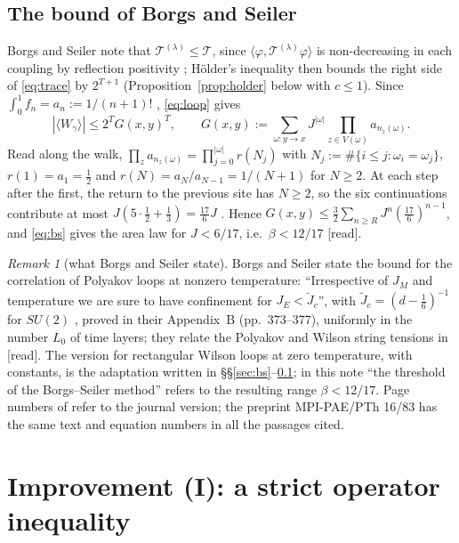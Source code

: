 \documentclass[11pt,a4paper]{article}
\theoremstyle{plain}
\theoremstyle{remark}
\newtheorem{remark}[theorem]{Remark}
\numberwithin{equation}{section}
\newcommand{\cT}{\mathcal{T}}
\newcommand{\st}[1]{\textsf{[#1]}}
\begin{document}
\subsection{The bound of Borgs and Seiler}\label{sec:bsbound}
Borgs and Seiler note that $\cT^{(\lambda)}\le\cT$, since $\langle\varphi,\cT^{(\lambda)}\varphi\rangle$ is non-decreasing in each
coupling by reflection positivity \cite[(B.11), p.~376]{BS83}; Hölder's inequality then bounds the right side of \eqref{eq:trace} by
$2^{T+1}$ (Proposition~\ref{prop:holder} below with $c\le1$). Since $\int_0^1f_n=a_n:=1/(n+1)!$ \cite[(B.14), p.~376]{BS83}, \eqref{eq:loop}
gives
\begin{equation}\label{eq:bs}
|\langle W_\gamma\rangle|\le2^TG(x,y)^T,\qquad G(x,y):=\sum_{\omega:y\to x}J^{|\omega|}\prod_{z\in V(\omega)}a_{n_z(\omega)} .
\end{equation}
Read along the walk, $\prod_za_{n_z(\omega)}=\prod_{j=0}^{|\omega|}r(N_j)$ with $N_j:=\#\{i\le j:\omega_i=\omega_j\}$, $r(1)=a_1=\frac12$
and $r(N)=a_N/a_{N-1}=1/(N+1)$ for $N\ge2$. At each step after the first, the return to the previous site has $N\ge2$, so the six
continuations contribute at most $J(5\cdot\frac12+\frac13)=\frac{17}6J$ \cite[p.~376]{BS83}. Hence $G(x,y)\le\frac32\sum_{n\ge R}
J^n(\frac{17}6)^{n-1}$, and \eqref{eq:bs} gives the area law for $J<6/17$, i.e.\ $\beta<12/17$ \cite[p.~376]{BS83} \st{read}.

\begin{remark}[what Borgs and Seiler state]\label{rem:bs-statement}
Borgs and Seiler state the bound for the correlation of Polyakov loops at nonzero temperature: ``Irrespective of $J_M$ and
temperature we are sure to have confinement for $J_E<\tilde J_c$'', with $\tilde J_c=(d-\frac16)^{-1}$ for $SU(2)$
\cite[(II.55), p.~343]{BS83}, proved in their Appendix~B (pp.~373--377), uniformly in the number $L_0$ of time layers; they relate the Polyakov and
Wilson string tensions in \cite[(II.48)--(II.50), p.~341]{BS83} \st{read}. The version for rectangular Wilson loops at zero
temperature, with constants, is the adaptation written in \S\S\ref{sec:bs}--\ref{sec:bsbound}; in this note
``the threshold of the Borgs--Seiler method'' refers to the resulting range $\beta<12/17$. Page numbers of \cite{BS83} refer to the
journal version; the preprint MPI-PAE/PTh 16/83 has the same text and equation numbers in all the passages cited.
\end{remark}

\section{Improvement (I): a strict operator inequality}\label{sec:I}
\end{document}
